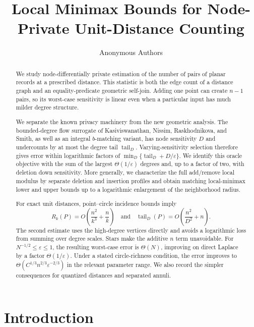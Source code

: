 \documentclass[11pt]{article}
\title{Local Minimax Bounds for Node-Private Unit-Distance Counting}
\author{Anonymous Authors}
\date{}
\newcommand{\eps}{\varepsilon}
\newcommand{\tail}{\operatorname{tail}}
\begin{document}
\begin{titlepage}
\maketitle

\begin{abstract}
We study node-differentially private estimation of the number of pairs of planar records at a prescribed distance. This statistic is both the edge count of a distance graph and an equality-predicate geometric self-join. Adding one point can create \(n-1\) pairs, so its worst-case sensitivity is linear even when a particular input has much milder degree structure.

We separate the known privacy machinery from the new geometric analysis. The bounded-degree flow surrogate of Kasiviswanathan, Nissim, Raskhodnikova, and Smith, as well as an integral \(b\)-matching variant, has node sensitivity \(D\) and undercounts by at most the degree tail \(\tail_D\). Varying-sensitivity selection therefore gives error within logarithmic factors of \(\min_D\{\tail_D+D/\eps\}\). We identify this oracle objective with the sum of the largest \(\Theta(1/\eps)\) degrees and, up to a factor of two, with deletion down sensitivity. More generally, we characterize the full add/remove local modulus by separate deletion and insertion profiles and obtain matching local-minimax lower and upper bounds up to a logarithmic enlargement of the neighborhood radius.

For exact unit distances, point--circle incidence bounds imply
\[
R_k(P)=O\!\left(\frac{n^2}{k^3}+\frac{n}{k}\right)
\quad\text{and}\quad
\tail_D(P)=O\!\left(\frac{n^2}{D^2}+n\right).
\]
The second estimate uses the high-degree vertices directly and avoids a logarithmic loss from summing over degree scales. Stars make the additive \(n\) term unavoidable. For \(N^{-1/2}\le\eps\le1\), the resulting worst-case error is \(\Theta(N)\), improving on direct Laplace by a factor \(\Theta(1/\eps)\). Under a stated circle-richness condition, the error improves to \(\Theta(C^{1/3}n^{2/3}\eps^{-2/3})\) in the relevant parameter range. We also record the simpler consequences for quantized distances and separated annuli.
\end{abstract}
\end{titlepage}

\section{Introduction}
\end{document}
